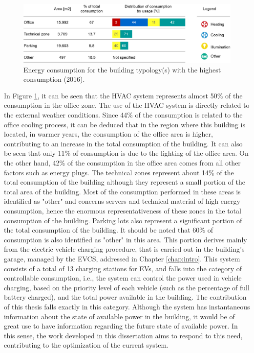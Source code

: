 \begin{figure}[h!]
    \centering
    \begin{center}
    \includegraphics[width=1\textwidth]{Images/ConsumoEDP.png}
    \caption{Energy consumption for the building typology(s) with the highest consumption (2016).}
    \label{consedp}
    \end{center}
\end{figure}
In Figure \ref{consedp}, it can be seen that the \ac{HVAC} system represents almost 50\% of the consumption in the office zone. The use of the \ac{HVAC} system is directly related to the external weather conditions. Since 44\% of the consumption is related to the office cooling process, it can be deduced that in the region where this building is located, in warmer years, the consumption of the office area is higher, contributing to an increase in the total consumption of the building. It can also be seen that only 11\% of consumption is due to the lighting of the office area. On the other hand, 42\% of the consumption in the office area comes from all other factors such as energy plugs. The technical zones represent about 14\% of the total consumption of the building although they represent a small portion of the total area of the building. Most of the consumption performed in these areas is identified as "other" and concerns servers and technical material of high energy consumption, hence the enormous representativeness of these zones in the total consumption of the building. Parking lots also represent a significant portion of the total consumption of the building. It should be noted that 60\% of consumption is also identified as "other" in this area. This portion derives mainly from the electric vehicle charging procedure, that is carried out in the building's garage, managed by the \ac{EVCS}, addressed in Chapter \ref{chap:intro}. This system consists of a total of 13 charging stations for \ac{EV}s, and falls into the category of controllable consumption, i.e., the system can control the power used in vehicle charging, based on the priority level of each vehicle (such as the percentage of full battery charged), and the total power available in the building. The contribution of this thesis falls exactly in this category. Although the system has instantaneous information about the state of available power in the building, it would be of great use to have information regarding the future state of available power. In this sense, the work developed in this dissertation aims to respond to this need, contributing to the optimization of the current system.

